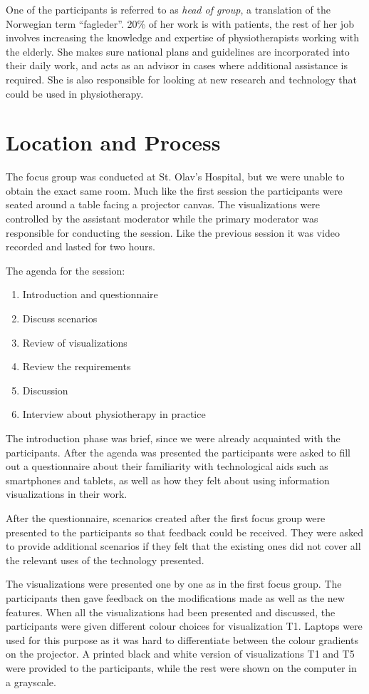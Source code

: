 One of the participants is referred to as \emph{head of group}, a translation of the Norwegian term ``fagleder''. 20\% of her work is with patients, the rest of her job involves increasing the knowledge and expertise of physiotherapists working with the elderly. She makes sure national plans and guidelines are incorporated into their daily work, and acts as an advisor in cases where additional assistance is required. She is also responsible for looking at new research and technology that could be used in physiotherapy.

\section{Location and Process}
The focus group was conducted at St. Olav's Hospital, but we were unable to obtain the exact same room.  Much like the first session the participants were seated around a table facing a projector canvas. The visualizations were controlled by the assistant moderator while the primary moderator was responsible for conducting the session. Like the previous session it was video recorded and lasted for two hours.

The agenda for the session:
\begin{enumerate}[itemsep=0cm, parsep=0cm]
  \item Introduction and questionnaire
  \item Discuss scenarios
  \item Review of visualizations
  \item Review the requirements
  \item Discussion
  \item Interview about physiotherapy in practice
\end{enumerate}

The introduction phase was brief, since we were already acquainted with the participants. After the agenda was presented the participants were asked to fill out a questionnaire about their familiarity with technological aids such as smartphones and tablets, as well as how they felt about using information visualizations in their work. 

After the questionnaire, scenarios created after the first focus group were presented to the participants so that feedback could be received. They were asked to provide additional scenarios if they felt that the existing ones did not cover all the relevant uses of the technology presented.

The visualizations were presented one by one as in the first focus group. The participants then gave feedback on the modifications made as well as the new features. When all the visualizations had been presented and discussed, the participants were given different colour choices for visualization T1. Laptops were used for this purpose as it was hard to differentiate between the colour gradients on the projector. A printed black and white version of visualizations T1 and T5 were provided to the participants, while the rest were shown on the computer in a grayscale.

